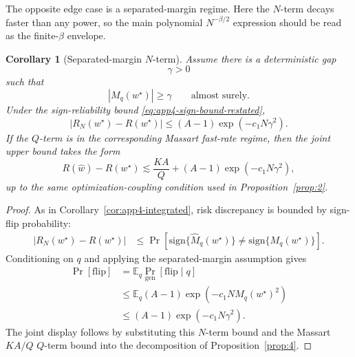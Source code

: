 \documentclass{article} %
\newtheorem{corollary}[theorem]{Corollary}
\providecommand{\E}{\mathbb{E}}
\providecommand{\Risk}{R}
\providecommand{\Mhat}{\widehat{M}}
\providecommand{\what}{\widehat{w}}
\providecommand{\wstar}{w^{\star}}
\begin{document}
The opposite edge case is a separated-margin regime.  Here the \(N\)-term decays faster than any power, so the main polynomial \(N^{-\beta/2}\) expression should be read as the finite-\(\beta\) envelope.

\begin{corollary}[Separated-margin \(N\)-term]
\label{cor:app4-separated}
Assume there is a deterministic gap
\begin{equation}
\label{eq:app4-gamma}
\gamma>0
\end{equation}
such that
\begin{equation}
\label{eq:app4-separated-assumption}
|M_q(\wstar)|
\ge
\gamma
\qquad
\text{almost surely}.
\end{equation}
Under the sign-reliability bound \eqref{eq:app4-sign-bound-restated},
\begin{equation}
\label{eq:app4-separated-floor}
\left|
R_N(\wstar)-\Risk(\wstar)
\right|
\le
(A-1)\exp\!\left(-c_1N\gamma^2\right).
\end{equation}
If the \(Q\)-term is in the corresponding Massart fast-rate regime, then the joint upper bound takes the form
\begin{equation}
\label{eq:app4-separated-joint}
\Risk(\what)-\Risk(\wstar)
\lesssim
\frac{KA}{Q}
+
(A-1)\exp\!\left(-c_1N\gamma^2\right),
\end{equation}
up to the same optimization-coupling condition used in Proposition~\ref{prop:2}.
\end{corollary}

\begin{proof}
As in Corollary~\ref{cor:app4-integrated}, risk discrepancy is bounded by sign-flip probability:
\begin{align}
\left|
R_N(\wstar)-\Risk(\wstar)
\right|
&\le
\Pr\!\left[
\mathrm{sign}\{\Mhat_q(\wstar)\}
\ne
\mathrm{sign}\{M_q(\wstar)\}
\right].
\label{eq:app4-separated-proof-a}
\end{align}
Conditioning on \(q\) and applying the separated-margin assumption gives
\begin{align}
\Pr[\mathrm{flip}]
&=
\E_q
\Pr_{\mathrm{gen}}\!\left[
\mathrm{flip}\mid q
\right]
\label{eq:app4-separated-proof-b}
\\
&\le
\E_q
(A-1)
\exp\!\left(-c_1N M_q(\wstar)^2\right)
\label{eq:app4-separated-proof-c}
\\
&\le
(A-1)
\exp\!\left(-c_1N\gamma^2\right).
\label{eq:app4-separated-proof-d}
\end{align}
The joint display follows by substituting this \(N\)-term bound and the Massart \(KA/Q\) \(Q\)-term bound into the decomposition of Proposition~\ref{prop:4}.
\end{proof}
\end{document}
